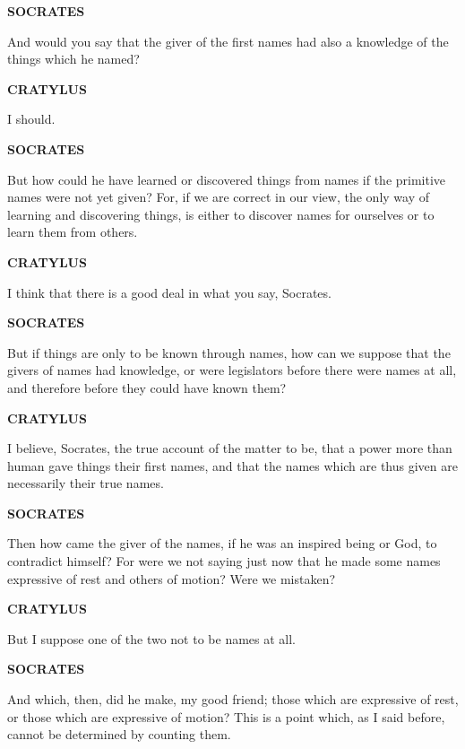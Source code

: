 \documentclass[11pt,letter]{article}
\begin{document}
\par \textbf{SOCRATES}
\par   And would you say that the giver of the first names had also a knowledge of the things which he named?

\par \textbf{CRATYLUS}
\par   I should.

\par \textbf{SOCRATES}
\par   But how could he have learned or discovered things from names if the primitive names were not yet given? For, if we are correct in our view, the only way of learning and discovering things, is either to discover names for ourselves or to learn them from others.

\par \textbf{CRATYLUS}
\par   I think that there is a good deal in what you say, Socrates.

\par \textbf{SOCRATES}
\par   But if things are only to be known through names, how can we suppose that the givers of names had knowledge, or were legislators before there were names at all, and therefore before they could have known them?

\par \textbf{CRATYLUS}
\par   I believe, Socrates, the true account of the matter to be, that a power more than human gave things their first names, and that the names which are thus given are necessarily their true names.

\par \textbf{SOCRATES}
\par   Then how came the giver of the names, if he was an inspired being or God, to contradict himself? For were we not saying just now that he made some names expressive of rest and others of motion? Were we mistaken?

\par \textbf{CRATYLUS}
\par   But I suppose one of the two not to be names at all.

\par \textbf{SOCRATES}
\par   And which, then, did he make, my good friend; those which are expressive of rest, or those which are expressive of motion? This is a point which, as I said before, cannot be determined by counting them.
\end{document}
